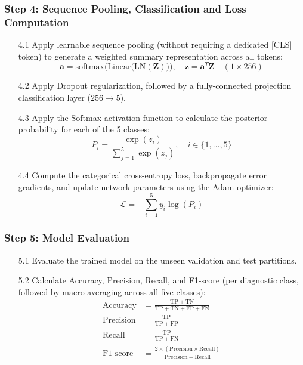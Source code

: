 \documentclass[12pt,a4paper]{report}
\renewcommand{\textbf}[1]{#1}
\begin{document}
\subsubsection*{Step 4: Sequence Pooling, Classification and Loss Computation}
\begin{enumerate}
  \item[\textbf{4.1}] Apply learnable sequence pooling (without requiring a dedicated [CLS] token) to generate a weighted summary representation across all tokens:
    \begin{equation}
      \mathbf{a} = \mathrm{softmax}\Big( \mathrm{Linear}\big( \mathrm{LN}(\mathbf{Z}) \big) \Big), \quad \mathbf{z} = \mathbf{a}^T \mathbf{Z} \quad (1 \times 256)
    \end{equation}
  \item[\textbf{4.2}] Apply Dropout regularization, followed by a fully-connected projection classification layer ($256 \to 5$).
  \item[\textbf{4.3}] Apply the Softmax activation function to calculate the posterior probability for each of the 5 classes:
    \begin{equation}
      P_i = \frac{\exp(z_i)}{\sum_{j=1}^5 \exp(z_j)}, \quad i \in \{1, \dots, 5\}
    \end{equation}
  \item[\textbf{4.4}] Compute the categorical cross-entropy loss, backpropagate error gradients, and update network parameters using the Adam optimizer:
    \begin{equation}
      \mathcal{L} = -\sum_{i=1}^5 y_i \log(P_i)
    \end{equation}
\end{enumerate}

\subsubsection*{Step 5: Model Evaluation}
\begin{enumerate}
  \item[\textbf{5.1}] Evaluate the trained model on the unseen validation and test partitions.
  \item[\textbf{5.2}] Calculate Accuracy, Precision, Recall, and F1-score (per diagnostic class, followed by macro-averaging across all five classes):
    \begin{align}
      \mathrm{Accuracy}  &= \frac{\mathrm{TP} + \mathrm{TN}}{\mathrm{TP} + \mathrm{TN} + \mathrm{FP} + \mathrm{FN}} \\
      \mathrm{Precision} &= \frac{\mathrm{TP}}{\mathrm{TP} + \mathrm{FP}} \\
      \mathrm{Recall}    &= \frac{\mathrm{TP}}{\mathrm{TP} + \mathrm{FN}} \\
      \text{F1-score}    &= \frac{2 \times (\mathrm{Precision} \times \mathrm{Recall})}{\mathrm{Precision} + \mathrm{Recall}}
    \end{align}
\end{enumerate}
\end{document}
